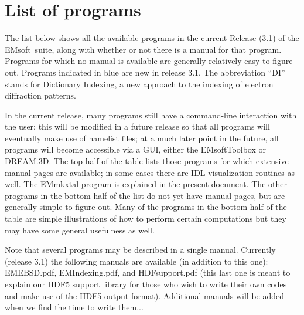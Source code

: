 \documentclass[DIV=calc, paper=letter, fontsize=11pt]{scrartcl}	 %
\newcommand{\ctp}{\textsf{EMsoft}}
\begin{document}
\section{List of programs\label{sec:executables}}
The list below shows all the available programs in the current Release (3.1) of the \ctp\ suite, along with whether or not there is a 
manual for that program.  Programs for which no manual is available are generally relatively easy to figure out.
Programs indicated in {\color{blue}blue} are new in release 3.1.  The abbreviation ``DI'' stands for Dictionary Indexing, a
new approach to the indexing of electron diffraction patterns.

In the current release, many programs still have a command-line interaction with the user; this will be modified
in a future release so that all programs will eventually make use of namelist files; at a much later point in the future,
all programs will become accessible via a GUI, either the \textsf{EMsoftToolbox} or \textsf{DREAM.3D}. The top half of the table
lists those programs for which extensive manual pages are available; in some cases there are IDL visualization routines as well. The \textsf{EMmkxtal}
program is explained in the present document.  The other programs in the bottom half of the list do not yet have manual pages, but are generally 
simple to figure out.  Many of the programs in the bottom half of the table are simple illustrations of how 
to perform certain computations but they may have some general usefulness as well.

Note that several programs may be described in a single manual.  Currently (release 3.1) the following manuals are available (in addition to this one):
\textsf{EMEBSD.pdf}, \textsf{EMIndexing.pdf}, and \textsf{HDFsupport.pdf} (this last one is meant to explain our HDF5 support library for those who wish
to write their own codes and make use of the HDF5 output format).  Additional manuals will be added when we find the time to write them...
\end{document}
